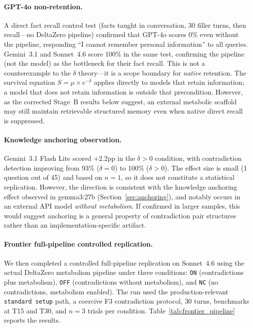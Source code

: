 \documentclass[11pt,a4paper]{article}
\begin{document}
\paragraph{GPT-4o non-retention.}
A direct fact recall control test (facts taught in conversation, 30 filler turns, then recall---no DeltaZero pipeline) confirmed that GPT-4o scores 0\% even without the pipeline, responding ``I cannot remember personal information'' to all queries. Gemini~3.1 and Sonnet~4.6 score 100\% in the same test, confirming the pipeline (not the model) as the bottleneck for their fact recall. This is not a counterexample to the $\delta$ theory---it is a scope boundary for \emph{native} retention. The survival equation $S = \mu \times e^{-\delta}$ applies directly to models that retain information; a model that does not retain information is outside that precondition. However, as the corrected Stage~B results below suggest, an external metabolic scaffold may still maintain retrievable structured memory even when native direct recall is suppressed.

\paragraph{Knowledge anchoring observation.}
Gemini~3.1 Flash Lite scored $+$2.2pp in the $\delta > 0$ condition, with contradiction detection improving from 93\% ($\delta = 0$) to 100\% ($\delta > 0$). The effect size is small (1 question out of 45) and based on $n = 1$, so it does not constitute a statistical replication. However, the direction is consistent with the knowledge anchoring effect observed in gemma3:27b (Section~\ref{sec:anchoring}), and notably occurs in an external API model \emph{without metabolism}. If confirmed in larger samples, this would suggest anchoring is a general property of contradiction pair structures rather than an implementation-specific artifact.

\paragraph{Frontier full-pipeline controlled replication.}
We then completed a controlled full-pipeline replication on Sonnet~4.6 using the actual DeltaZero metabolism pipeline under three conditions: \texttt{ON} (contradictions plus metabolism), \texttt{OFF} (contradictions without metabolism), and \texttt{NC} (no contradictions, metabolism enabled). The run used the production-relevant \texttt{standard setup} path, a coercive F3 contradiction protocol, 30 turns, benchmarks at T15 and T30, and $n = 3$ trials per condition. Table~\ref{tab:frontier_pipeline} reports the results.
\end{document}
